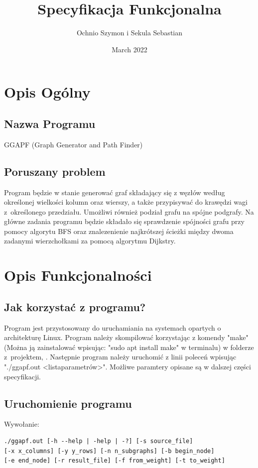 \documentclass{article}
\title{Specyfikacja Funkcjonalna}
\author{Ochnio Szymon i Sekula Sebastian}
\date{March 2022}
\begin{document}
\maketitle

\section{Opis Ogólny}
\subsection{Nazwa Programu}
GGAPF (Graph Generator and Path Finder)
\subsection{Poruszany problem}
Program będzie w stanie generować graf składający się z węzłów według określonej wielkości kolumn oraz wierszy, a także przypisywać do krawędzi wagi z~określonego przedziału. Umożliwi również podział grafu na spójne podgrafy. Na główne zadania programu będzie składało się sprawdzenie spójności grafu przy pomocy algorytu BFS oraz znalezenienie najkrótszej ścieżki między dwoma zadanymi wierzchołkami za pomocą algorytmu Dijkstry.

\section{Opis Funkcjonalności}
\subsection{Jak korzystać z programu?}
Program jest przystosowany do uruchamiania na systemach opartych o architekturę Linux.
Program należy skompilować korzystając z komendy "make" (Można ją zainstalować wpisując: "sudo apt install make" w terminalu) w folderze z~projektem, .
Następnie program należy uruchomić z linii poleceń wpisując "./ggapf.out \textless lista\mathunderscore parametrów\textgreater". Możliwe paramtery opisane są w dalszej części specyfikacji.
\subsection{Uruchomienie programu}
Wywołanie: 
\begin{lstlisting}
./ggapf.out [-h --help | -help | -?] [-s source_file]
[-x x_columns] [-y y_rows] [-n n_subgraphs] [-b begin_node] 
[-e end_node] [-r result_file] [-f from_weight] [-t to_weight]
\end{lstlisting}
\end{document}
